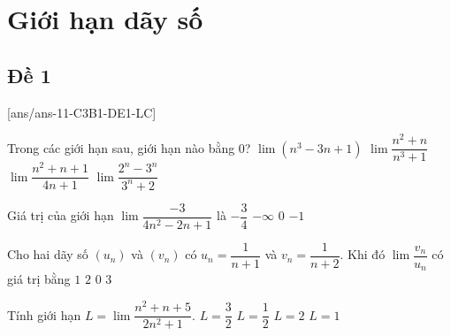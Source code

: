\section{Giới hạn dãy số}

\subsection{Đề 1}
[ans/ans-11-C3B1-DE1-LC]
\caulc
\begin{ex}%
	Trong các giới hạn sau, giới hạn nào bằng $0$?
	\choice
	{$ \lim(n^3-3n+1) $}
	{\True $ \lim\dfrac{n^2+n}{n^3+1} $}
	{$ \lim\dfrac{n^2+n+1}{4n+1} $}
	{$ \lim\dfrac{2^n-3^n}{3^n+2} $}
\end{ex}
\begin{ex}%
	Giá trị của giới hạn $\lim \dfrac{-3}{4{n^2}-2n+1}$ là
	\choice
		{$-\dfrac{3}{4}$}
		{$-\infty$}
		{\True $0$}
		{$-1$}
\end{ex}
\begin{ex}%
	Cho hai dãy số $\left({u_n} \right)$ và $\left({v_n} \right)$ có ${u_n}=\dfrac{1}{n+1}$ và ${v_n}=\dfrac{1}{n+2}$. Khi đó $\lim \dfrac{{v_n}}{{u_n}}$ có giá trị bằng
	\choice
		{\True $1$}
		{$2$}
		{$0$}
		{$3$}
\end{ex}
\begin{ex}%
	Tính giới hạn $L=\lim \dfrac{{n^2}+n+5}{2{n^2}+1}$.
	\choice
		{$L=\dfrac{3}{2}$}
		{\True $L=\dfrac{1}{2}$}
		{$L=2$}
		{$L=1$}
\end{ex}

